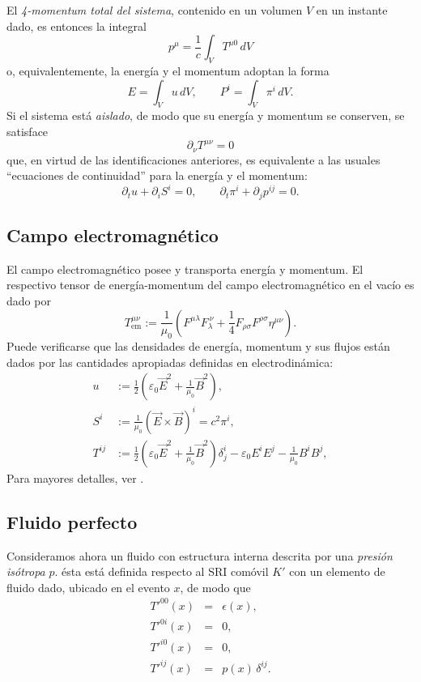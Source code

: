 El \textit{4-momentum total del sistema}, contenido en un volumen $V$ en un instante dado, es entonces la integral
\begin{equation}
p^\mu=\frac{1}{c}\int_V T^{\mu 0}\,dV \label{pmTmn}
\end{equation}
o, equivalentemente, la energía y el momentum adoptan la forma
\begin{equation}
E=\int_V u\,dV, \qquad P^i=\int_V \pi^i\,dV.
\end{equation}
Si el sistema está \textit{aislado}, de modo que su energía y momentum se conserven, se satisface 
\begin{equation}
 \partial_\nu T^{\mu \nu}=0
\end{equation}
que, en virtud de las identificaciones anteriores, es equivalente a las usuales ``ecuaciones de continuidad'' para la energía y el momentum:
\begin{equation}
 \partial_tu+\partial_iS^i=0, \qquad \partial_t \pi^i+\partial_jp^{ij}=0.
\end{equation}


\subsection{Campo electromagnético}
El campo electromagnético posee y transporta energía y momentum. El respectivo tensor de energía-momentum del campo electromagnético en el vacío es dado por
\begin{equation}
\boxed{T_\text{em}^{\mu\nu}:=\frac{1}{\mu_0}\left(  F^{\mu\lambda}F_\lambda^{\ \nu}+\frac{1}{4}F_{\rho\sigma}F^{\rho\sigma}\eta^{\mu\nu} \right).}  \label{temsimSI}
\end{equation}
Puede verificarse que las densidades de energía, momentum y sus flujos están dados por las cantidades apropiadas definidas en electrodinámica:
\begin{align}
u &:= \frac{1}{2}\left(\varepsilon_0\vec{E}^2+\frac{1}{\mu_0}\vec{B}^2\right),\label{uTheta}\\
S^i &:= \frac{1}{\mu_0}\left(\vec{E}\times\vec{B}\right)^i=c^2\pi^i, \label{STheta}\\
T^{ij} &:= \frac{1}{2}\left(\varepsilon_0\vec{E}^2+\frac{1}{\mu_0}\vec{B}^2\right)\delta_j^i-\varepsilon_0 E^i E^j -\frac{1}{\mu_0}B^i B^j , \label{TTheta}
\end{align}
Para mayores detalles, ver \cite{7}.


\subsection{Fluido perfecto}
Consideramos ahora un fluido con estructura interna descrita por una \textit{presión
isótropa} $p$. ésta está definida respecto al SRI comóvil $K'$ con un elemento de fluido dado, ubicado en el evento $x$, de modo que
\begin{eqnarray}
T'^{00}(x)&=&\epsilon(x) , \label{t00c}\\
T'^{0i}(x) &=&0, \label{t0ic}\\
T'^{i0}(x) &=&0, \label{ti0c}\\
T'^{ij}(x) &=&p(x)\,\delta^{ij} .\label{tijc}
\end{eqnarray}

